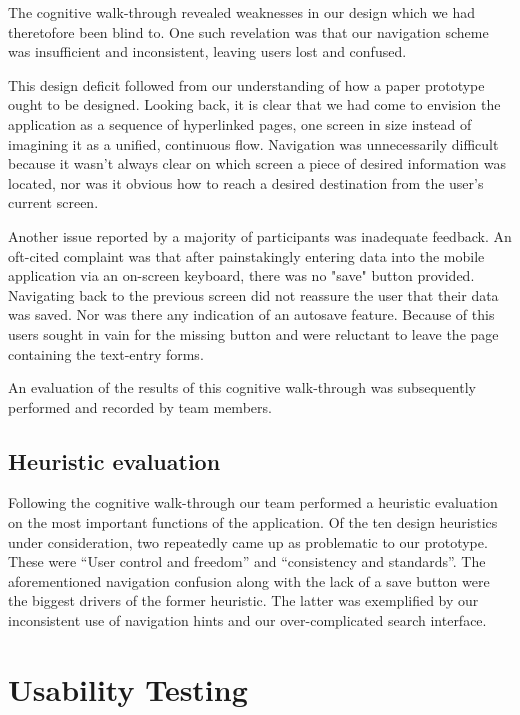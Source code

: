\documentclass{sigchi-ext}
\begin{document}
The cognitive walk-through revealed weaknesses in our design which we had theretofore been blind to.
One such revelation was that our navigation scheme was insufficient and inconsistent, leaving users
lost and confused.

This design deficit followed from our understanding of how a paper prototype
ought to be designed. Looking back, it is clear that we had come to envision
the application as a sequence of hyperlinked pages, one screen in size instead
of imagining it as a unified, continuous flow.  Navigation was unnecessarily
difficult because it wasn't always clear on which screen a piece of desired
information was located, nor was it obvious how to reach a desired destination
from the user's current screen.

Another issue reported by a majority of participants was inadequate feedback.
An oft-cited complaint was that after painstakingly entering data into the
mobile application via an on-screen keyboard, there was no "save" button
provided. Navigating back to the previous screen did not reassure the user that
their data was saved. Nor was there any indication of an autosave feature.
Because of this users sought in vain for the missing button and were reluctant
to leave the page containing the text-entry forms.

An evaluation of the results of this cognitive walk-through was subsequently
performed and recorded by team members.


\subsection{Heuristic evaluation}

Following the cognitive walk-through our team performed a heuristic evaluation on the most important
functions of the application. Of the ten design heuristics under consideration, two repeatedly came
up as problematic to our prototype. These were ``User control and freedom'' and ``consistency and
standards''. The aforementioned navigation confusion along with the lack of a save button were the
biggest drivers of the former heuristic. The latter was exemplified by our inconsistent use of
navigation hints and our over-complicated search interface.



\section{Usability Testing}
\end{document}
